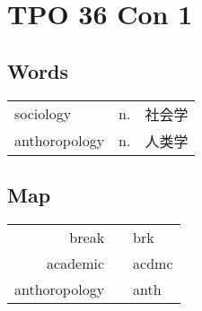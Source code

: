 \section{TPO 36 Con 1}

\subsection{Words}

\begin{tabular}{lll}
    sociology     & n. & 社会学 \\
    anthoropology & n. & 人类学 \\
\end{tabular}

\subsection{Map}

\begin{tabular}{rc@{\quad$\to$\quad}l}
    break         &  & brk   \\
    academic      &  & acdmc \\
    anthoropology &  & anth  \\
\end{tabular}
